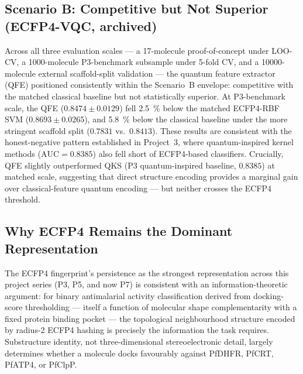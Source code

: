 \subsection{Scenario B: Competitive but Not Superior (ECFP4-VQC, archived)}
\label{sec:disc_qfe}

Across all three evaluation scales — a \num{17}-molecule proof-of-concept
under LOO-CV, a \num{1000}-molecule P3-benchmark subsample under 5-fold CV,
and a \num{10000}-molecule external scaffold-split validation — the quantum
feature extractor (QFE) positioned consistently within the Scenario~B
envelope: competitive with the matched classical baseline but not
statistically superior. At P3-benchmark scale, the QFE
($0.8474 \pm 0.0129$) fell \qty{2.5}{\percent} below the matched
ECFP4-RBF SVM ($0.8693 \pm 0.0265$), and \qty{5.8}{\percent} below the
classical baseline under the more stringent scaffold split
($0.7831$ vs.\ $0.8413$). These results are consistent with the
honest-negative pattern established in Project~3\cite{sao2026p3}, where
quantum-inspired kernel methods ($\text{AUC} = 0.8385$) also fell short
of ECFP4-based classifiers. Crucially, QFE slightly outperformed QKS
(P3 quantum-inspired baseline, $0.8385$) at matched scale, suggesting
that direct structure encoding provides a marginal gain over classical-feature
quantum encoding — but neither crosses the ECFP4 threshold.

\subsection{Why ECFP4 Remains the Dominant Representation}

The ECFP4 fingerprint's persistence as the strongest representation across
this project series (P3, P5, and now P7) is consistent with an
information-theoretic argument: for binary antimalarial activity classification
derived from docking-score thresholding — itself a function of molecular shape
complementarity with a fixed protein binding pocket — the topological
neighbourhood structure encoded by radius-2 ECFP4 hashing is
precisely the information the task requires. Substructure identity, not
three-dimensional stereoelectronic detail, largely determines whether a
molecule docks favourably against PfDHFR, PfCRT, PfATP4, or PfClpP.

